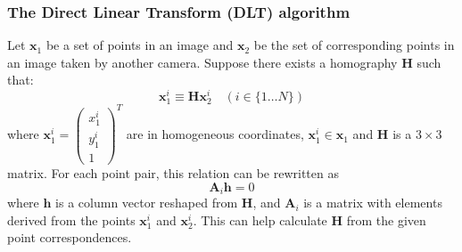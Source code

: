 \documentclass[a3paper,12pt]{extarticle} %
\begin{document}
\subsubsection{The Direct Linear Transform (DLT) algorithm}
    Let $\mathbf{x}_1$ be a set of points in an image and $\mathbf{x}_2$ be the set of corresponding points in an image taken by another camera. Suppose there exists a homography $\mathbf{H}$ such that:
    \[
    \mathbf{x}_1^i \equiv \mathbf{H} \mathbf{x}_2^i \quad (i \in \{1 \ldots N\})
    \]
    where $\mathbf{x}_1^i = \begin{pmatrix} x_1^i \\ y_1^i \\ 1 \end{pmatrix}^T$ are in homogeneous coordinates, $\mathbf{x}_1^i \in \mathbf{x}_1$ and $\mathbf{H}$ is a $3 \times 3$ matrix. For each point pair, this relation can be rewritten as
    \[
    \mathbf{A}_i \mathbf{h} = 0
    \]
    where $\mathbf{h}$ is a column vector reshaped from $\mathbf{H}$, and $\mathbf{A}_i$ is a matrix with elements derived from the points $\mathbf{x}_1^i$ and $\mathbf{x}_2^i$. This can help calculate $\mathbf{H}$ from the given point correspondences.
\end{document}
